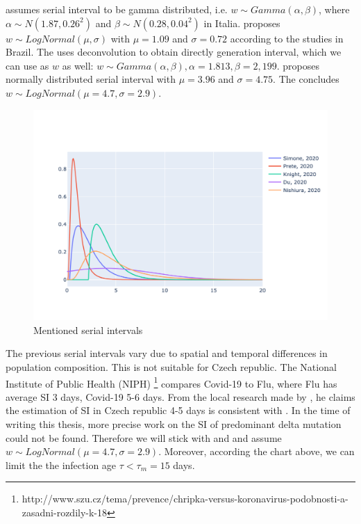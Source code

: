 \documentclass[
  digital, %
  table,   %
  twoside, %
  12pt,
  lof,     %
  lot,     %
]{fithesis3}
\begin{document}
\cite{simone2020} assumes serial interval to be gamma 
distributed, i.e. $w \sim Gamma(\alpha,\beta)$, where 
$\alpha \sim N \left( 1.87, 0.26^2 \right)$ and 
$\beta \sim N \left( 0.28, 0.04^2 \right)$ in Italia. 
\cite{prete2020} proposes $w \sim LogNormal(\mu, \sigma)$ 
with $\mu = 1.09$ and $\sigma = 0.72$ according to the 
studies in Brazil. The \cite{knight2020} uses deconvolution 
to obtain directly generation interval, which we can use 
as $w$ as well: $w \sim Gamma(\alpha, \beta), \alpha = 1.813, \beta = 2,199$.
\cite{du2020} proposes normally distributed serial 
interval with $\mu = 3.96$ and $\sigma = 4.75$. 
The \cite{nishiura2020} concludes 
$w \sim LogNormal \left( \mu = 4.7, \sigma = 2.9 \right)$.

\begin{figure}[h]
  \begin{center}
    \includegraphics[width=\textwidth]{images/serial-intervals-overview.png}
  \end{center}
  \caption{Mentioned serial intervals}
  \label{fig:serial-intervals-overview}
\end{figure}

The previous serial intervals vary due to spatial and 
temporal differences in population composition. 
This is not suitable for Czech republic. 
The National Institute of Public Health (NIPH) 
\footnote{http://www.szu.cz/tema/prevence/chripka-versus-koronavirus-podobnosti-a-zasadni-rozdily-k-18} 
compares Covid-19 to Flu, where Flu has average SI 3 days, 
Covid-19 5-6 days. From the local research made by \cite{majek2020}, 
he claims the estimation of SI in Czech republic 4-5 days is 
consistent with \cite{nishiura2020}. 
In the time of writing this thesis, more precise work on the 
SI of predominant delta mutation could not be found. 
Therefore we will stick with \cite{majek2020} and 
\cite{nishiura2020} and assume 
$w \sim LogNormal \left( \mu = 4.7, \sigma = 2.9 \right)$. 
Moreover, according the chart above, we can limit the the 
infection age $\tau < \tau_m = 15$ days.
\end{document}
